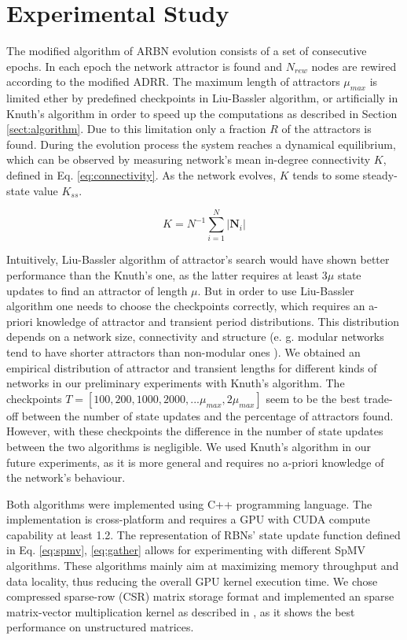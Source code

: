 \documentclass[procedia]{easychair}
\begin{document}
	
	\section{Experimental Study}
	\label{sect:experimental-study}
	
The modified algorithm of ARBN evolution consists of a set of consecutive epochs. In each epoch the network attractor is found and $N_{rew}$ nodes are rewired according to the modified ADRR. The maximum length of attractors $\mu_{max}$ is limited ether by predefined checkpoints in Liu-Bassler algorithm, or artificially in Knuth's algorithm in order to speed up the computations as described in Section \ref{sect:algorithm}. Due to this limitation only a fraction $R$ of the attractors is found. During the evolution process the system reaches a dynamical equilibrium, which can be observed by measuring network's mean in-degree connectivity $K$, defined in Eq. \ref{eq:connectivity}. As the network evolves, $K$ tends to some steady-state value $K_{ss}$.
	
	
	\begin{equation}
	\label{eq:connectivity}
		K = N^{-1} \sum_{i=1}^{N} {|\mathbf{N}_i|}
	\end{equation}
	
	Intuitively, Liu-Bassler algorithm of attractor's search would have shown better performance than the Knuth's one, as the latter requires at least $3 \mu$ state updates to find an attractor of length $\mu$. But in order to use Liu-Bassler algorithm one needs to choose the checkpoints correctly, which requires an a-priori knowledge of attractor and transient period distributions. This distribution depends on a network size, connectivity and structure (e. g. modular networks tend to have shorter attractors than non-modular ones \cite{Gorski2016}). We obtained an empirical distribution of attractor and transient lengths for different kinds of networks in our preliminary experiments with Knuth's algorithm. The checkpoints $T=[100, 200, 1000, 2000, ... \mu_{max}, 2 \mu_{max}]$ seem to be the best trade-off between the number of state updates and the percentage of attractors found. However, with these checkpoints the difference in the number of state updates between the two algorithms is negligible. We used Knuth's algorithm in our future experiments, as it is more general and requires no a-priori knowledge of the network's behaviour.
	
	Both algorithms were implemented using C++ programming language. The implementation is cross-platform and requires a GPU with CUDA compute capability at least 1.2. The representation of RBNs' state update function defined in Eq. \ref{eq:spmv}, \ref{eq:gather} allows for experimenting with different SpMV algorithms. These algorithms mainly aim at maximizing memory throughput and data locality, thus reducing the overall GPU kernel execution time. We chose compressed sparse-row (CSR) matrix storage format and implemented an sparse matrix-vector multiplication kernel as described in \cite{bell2008efficient}, as it shows the best performance on unstructured matrices.
	
\end{document}
